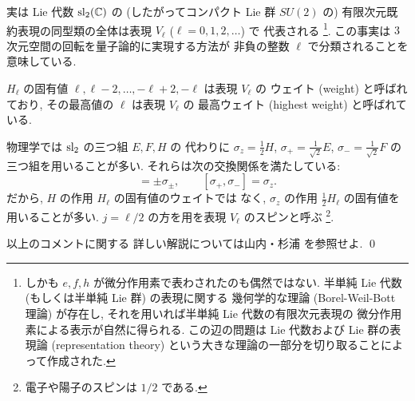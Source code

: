 \documentclass[12pt,twoside]{jarticle}
\begin{document}
\begin{guide}
  実は Lie 代数 $\mathrm{sl}_2({\mathbb C})$ の (したがってコンパクト Lie 群 $SU(2)$ の)
  有限次元既約表現の同型類の全体は表現 $V_\ell$ ($\ell=0,1,2,\ldots$) で
  代表される%
  \footnote{しかも $e,f,h$ が微分作用素で表わされたのも偶然ではない.
    半単純 Lie 代数 (もしくは半単純 Lie 群) の表現に関する
    幾何学的な理論 (Borel-Weil-Bott 理論) が存在し, 
    それを用いれば半単純 Lie 代数の有限次元表現の
    微分作用素による表示が自然に得られる.
    この辺の問題は Lie 代数および Lie 群の表現論 (representation theory) 
    という大きな理論の一部分を切り取ることによって作成された.}.
  この事実は $3$ 次元空間の回転を量子論的に実現する方法が
  非負の整数 $\ell$ で分類されることを意味している.

  $H_\ell$ の固有値 $\ell,\ell-2,\ldots,-\ell+2,-\ell$ は表現 $V_\ell$ の
  ウェイト (weight) と呼ばれており, その最高値の $\ell$ は表現 $V_\ell$ の
  最高ウェイト (highest weight) と呼ばれている.

  物理学では $\mathrm{sl}_2$ の三つ組 $E,F,H$ の
  代わりに $\sigma_z=\frac{1}{2}H$, $\sigma_+=\frac{1}{\sqrt{2}}E$, %
  $\sigma_-=\frac{1}{\sqrt{2}}F$ の三つ組を用いることが多い.
  それらは次の交換関係を満たしている:
  \begin{equation*}
    [\sigma_z, \sigma_\pm] = \pm\sigma_\pm, \qquad
    [\sigma_+, \sigma_-] = \sigma_z.
  \end{equation*}
  だから, $H$ の作用 $H_\ell$ の固有値のウェイトでは
  なく, $\sigma_z$ の作用 $\frac{1}{2}H_\ell$ の固有値を用いることが多い.
  $j=\ell/2$ の方を用を表現 $V_\ell$ のスピンと呼ぶ%
  \footnote{電子や陽子のスピンは $1/2$ である.}.

  以上のコメントに関する
  詳しい解説については山内・杉浦 \cite{YS} を参照せよ.
  \qed
\end{guide}

\end{document}

